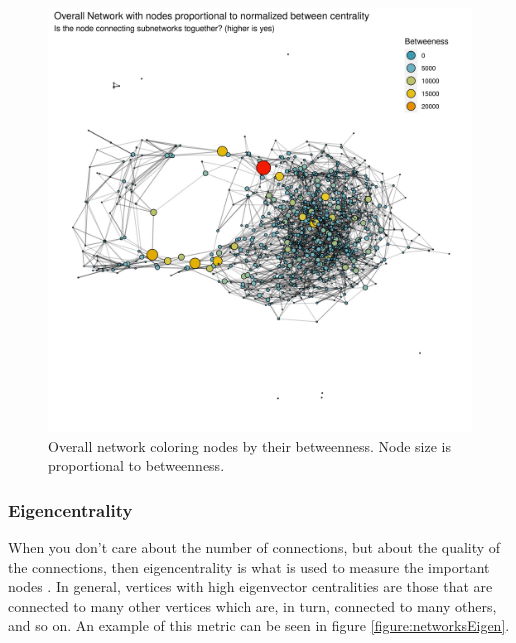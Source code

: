    \begin{figure}[h!]
        \centering
            \includegraphics[width=0.9\linewidth]{figures/Networks/Centralities/Graph_overallEdgesDF_centralitiesDF_Betweeness___mds.png} 
        \caption{Overall network coloring nodes by their betweenness. Node size is proportional to betweenness.}
        \label{figure:networksBetweenness}
    \end{figure}      

\subsubsection{Eigencentrality}

When you don't care about the number of connections, but about the quality of the connections, then eigencentrality is what is used to measure the important nodes \cite{Bonacich1972}. In general, vertices with high eigenvector centralities are those that are connected to many other vertices which are, in turn, connected to many others, and so on. An example of this metric can be seen in figure \ref{figure:networksEigen}.

